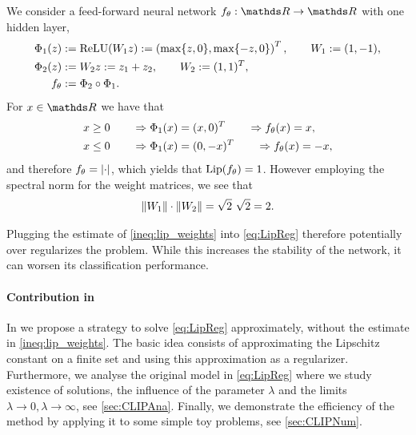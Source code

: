 \begin{example}{}{}
We consider a feed-forward neural network $\net_\param:\R\to\R$ with one hidden layer,
%
\begin{align*}
\Phi_1(z) &:= \operatorname{ReLU}(W_1 z) :=\left(\max\{z, 0\}, \max\{-z, 0\}\right)^T,\qquad 
W_1:= (1,-1),\\
\Phi_2(z) &:= W_2 z := z_1 + z_2,\qquad W_2:=(1,1)^T,\\
f_\theta&:= \Phi_2\circ\Phi_1.
\end{align*}
%
For $\inp\in\R$ we have that 
%
\begin{align*}
x&\geq 0 \qquad\Rightarrow\Phi_1(x) = (x, 0)^T \qquad\Rightarrow f_\theta(x)=x,\\
x&\leq 0 \qquad\Rightarrow\Phi_1(x) = (0, -x)^T \qquad\Rightarrow f_\theta(x)=-x,
\end{align*}
%
and therefore $f_\theta = \left|\cdot\right|$, which yields that $\operatorname{Lip}(f_\theta)=1$. However employing the spectral norm for the weight matrices, we see that
%
\begin{align*}
\left\|W_1\right\|\cdot\left\|W_2\right\| = \sqrt{2}\ \sqrt{2} = 2.	
\end{align*}
%
\end{example}
%
\noindent%
Plugging the estimate of \cref{ineq:lip_weights} into \cref{eq:LipReg} therefore potentially over regularizes the problem. While this increases the stability of the network, it can worsen its classification performance.
%
\paragraph{Contribution in \cite{bungert2021clip}} In \cite{bungert2021clip} we propose a strategy to solve \cref{eq:LipReg} approximately, without the estimate in \cref{ineq:lip_weights}. The basic idea consists of approximating the Lipschitz constant on a finite set and using this approximation as a regularizer. Furthermore, we analyse the original model in \cref{eq:LipReg} where we study existence of solutions, the influence of the parameter $\lambda$ and the limits $\lambda\to 0, \lambda\to \infty$, see \cref{sec:CLIPAna}. Finally, we demonstrate the efficiency of the method by applying it to some simple toy problems, see \cref{sec:CLIPNum}.


